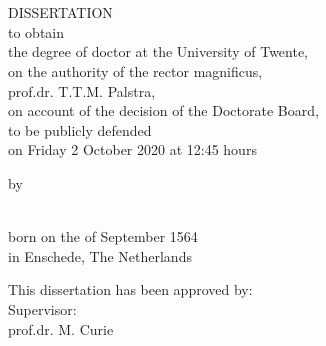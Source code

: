 \begin{titlepage}
    \ifprintcover
        \thispagestyle{empty}
        
        \cleardoublepage  
    \fi
    \thispagestyle{empty}
    \center
    \vspace*{1cm}

    \textbf{\Huge{\MakeUppercase\myTitle}}\\
    \vspace{0.5cm}
    \Large{\MakeUppercase\mySubTitle}

    \vspace{3cm}

    \textbf{\myAuthorName}
    \vfill
    
    \cleardoublepage
    
   
    \thispagestyle{empty}
    \center

    \textbf{\huge{\MakeUppercase\myTitle}}\\
    \vspace{0.5cm}
    \Large{\MakeUppercase\mySubTitle}
        
    \vfill

    \Large{DISSERTATION}\\
   
    \vfill
    \normalsize
    to obtain\\
    the degree of doctor at the University of Twente,\\
    on the authority of the rector magnificus,\\
    prof.dr. T.T.M. Palstra,\\
    on account of the decision of the Doctorate Board,\\
    to be publicly defended\\
    on Friday 2 October 2020 at 12:45 hours

    \vfill

    by
    
    \vfill
    
    \textbf{\large{\myAuthorName}}\\[2\baselineskip]
    
    born on the  of September 1564\\
    in Enschede, The Netherlands


    \clearpage
    \thispagestyle{empty}
    \raggedright 
    
    This dissertation has been approved by:\\[2\baselineskip]
    
    Supervisor:\\
    prof.dr. M. Curie 
    

\end{titlepage}

